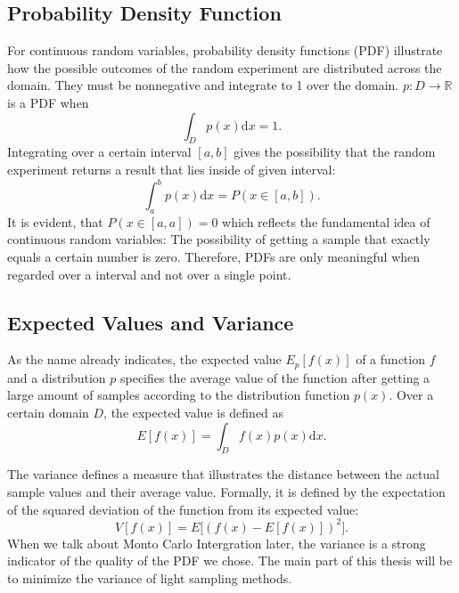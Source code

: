 \subsection{Probability Density Function}

For continuous random variables, probability density functions (PDF) illustrate how the possible outcomes of the random experiment are distributed across the domain. They must be nonnegative and integrate to 1 over the domain. $p:D \rightarrow \mathbb{R}$ is a PDF when
\begin{equation}
\int_{D}p(x)\mathrm{d}x = 1.
\end{equation}
Integrating over a certain interval $[a, b]$ gives the possibility that the random experiment returns a result that lies inside of given interval:
\begin{equation}
\int_{a}^{b}p(x)\mathrm{d}x = P(x \in [a, b]).
\end{equation}
It is evident, that $P(x \in [a, a]) = 0$ which reflects the fundamental idea of continuous random variables: The possibility of getting a sample that exactly equals a certain number is zero. Therefore, PDFs are only meaningful when regarded over a interval and not over a single point.

\subsection{Expected Values and Variance}

As the name already indicates, the expected value $E_p[f(x)]$ of a function $f$ and a distribution $p$ specifies the average value of the function after getting a large amount of samples according to the distribution function $p(x)$. Over a certain domain $D$, the expected value is defined as
\begin{equation}
E[f(x)] = \int_{D}f(x)p(x)\mathrm{d}x.
\end{equation}

The variance defines a measure that illustrates the distance between the actual sample values and their average value. Formally, it is defined by the expectation of the squared deviation of the function from its expected value:
\begin{equation}
V[f(x)] = E\bigg[(f(x) - E[f(x)])^2\bigg].
\end{equation}
When we talk about Monto Carlo Intergration later, the variance is a strong indicator of the quality of the PDF we chose. The main part of this thesis will be to minimize the variance of light sampling methods.

